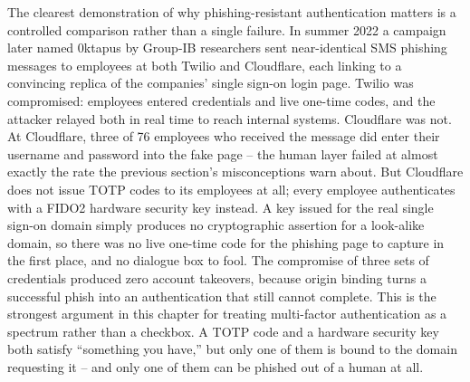 \begin{example}
The clearest demonstration of why phishing-resistant authentication matters is a controlled
comparison rather than a single failure. In summer 2022 a campaign later named 0ktapus by
Group-IB researchers sent near-identical SMS phishing messages to employees at both Twilio and
Cloudflare, each linking to a convincing replica of the companies' single sign-on login
page. Twilio was compromised: employees entered credentials and live one-time
codes, and the attacker relayed both in real time to reach internal systems. Cloudflare was not.
At Cloudflare, three of 76 employees who received the message did enter their username and
password into the fake page -- the human layer failed at almost exactly the rate the previous
section's misconceptions warn about. But Cloudflare does not issue TOTP codes to its employees at
all; every employee authenticates with a FIDO2 hardware security key instead. A key issued for the
real single sign-on domain simply produces no cryptographic assertion for a look-alike domain, so
there was no live one-time code for the phishing page to capture in the first place, and no
dialogue box to fool. The compromise of three sets of credentials produced zero
account takeovers, because origin binding turns a successful phish into an authentication that
still cannot complete. This is the strongest argument in this chapter for treating multi-factor
authentication as a spectrum rather than a checkbox. A TOTP code and a hardware security key both
satisfy ``something you have,'' but only one of them is bound to the domain requesting it -- and
only one of them can be phished out of a human at all.
\end{example}

